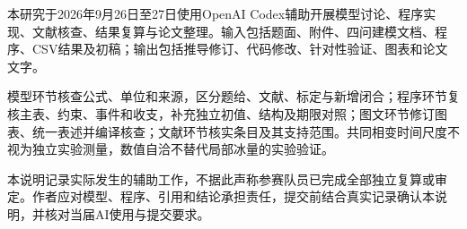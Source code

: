 \documentclass[bwprint]{gmcmthesis}
\numberwithin{equation}{section}
\numberwithin{figure}{section}
\begin{document}
本研究于2026年9月26日至27日使用OpenAI Codex辅助开展模型讨论、程序实现、文献核查、结果复算与论文整理。输入包括题面、附件、四问建模文档、程序、CSV结果及初稿；输出包括推导修订、代码修改、针对性验证、图表和论文文字。

模型环节核查公式、单位和来源，区分题给、文献、标定与新增闭合；程序环节复核主表、约束、事件和收支，补充独立初值、结构及期限对照；图文环节修订图表、统一表述并编译核查；文献环节核实条目及其支持范围。共同相变时间尺度不视为独立实验测量，数值自洽不替代局部冰量的实验验证。

本说明记录实际发生的辅助工作，不据此声称参赛队员已完成全部独立复算或审定。作者应对模型、程序、引用和结论承担责任，提交前结合真实记录确认本说明，并核对当届AI使用与提交要求。
\end{document}

